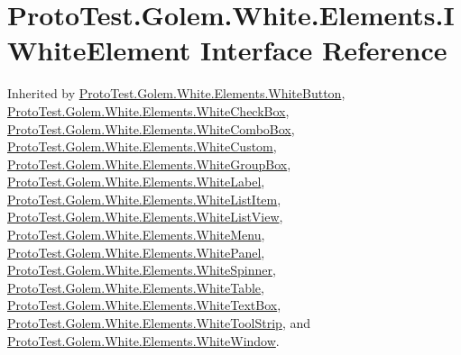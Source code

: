 \hypertarget{interface_proto_test_1_1_golem_1_1_white_1_1_elements_1_1_i_white_element}{\section{Proto\-Test.\-Golem.\-White.\-Elements.\-I\-White\-Element Interface Reference}
\label{interface_proto_test_1_1_golem_1_1_white_1_1_elements_1_1_i_white_element}
}


Inherited by \hyperlink{class_proto_test_1_1_golem_1_1_white_1_1_elements_1_1_white_button}{Proto\-Test.\-Golem.\-White.\-Elements.\-White\-Button}, \hyperlink{class_proto_test_1_1_golem_1_1_white_1_1_elements_1_1_white_check_box}{Proto\-Test.\-Golem.\-White.\-Elements.\-White\-Check\-Box}, \hyperlink{class_proto_test_1_1_golem_1_1_white_1_1_elements_1_1_white_combo_box}{Proto\-Test.\-Golem.\-White.\-Elements.\-White\-Combo\-Box}, \hyperlink{class_proto_test_1_1_golem_1_1_white_1_1_elements_1_1_white_custom}{Proto\-Test.\-Golem.\-White.\-Elements.\-White\-Custom}, \hyperlink{class_proto_test_1_1_golem_1_1_white_1_1_elements_1_1_white_group_box}{Proto\-Test.\-Golem.\-White.\-Elements.\-White\-Group\-Box}, \hyperlink{class_proto_test_1_1_golem_1_1_white_1_1_elements_1_1_white_label}{Proto\-Test.\-Golem.\-White.\-Elements.\-White\-Label}, \hyperlink{class_proto_test_1_1_golem_1_1_white_1_1_elements_1_1_white_list_item}{Proto\-Test.\-Golem.\-White.\-Elements.\-White\-List\-Item}, \hyperlink{class_proto_test_1_1_golem_1_1_white_1_1_elements_1_1_white_list_view}{Proto\-Test.\-Golem.\-White.\-Elements.\-White\-List\-View}, \hyperlink{class_proto_test_1_1_golem_1_1_white_1_1_elements_1_1_white_menu}{Proto\-Test.\-Golem.\-White.\-Elements.\-White\-Menu}, \hyperlink{class_proto_test_1_1_golem_1_1_white_1_1_elements_1_1_white_panel}{Proto\-Test.\-Golem.\-White.\-Elements.\-White\-Panel}, \hyperlink{class_proto_test_1_1_golem_1_1_white_1_1_elements_1_1_white_spinner}{Proto\-Test.\-Golem.\-White.\-Elements.\-White\-Spinner}, \hyperlink{class_proto_test_1_1_golem_1_1_white_1_1_elements_1_1_white_table}{Proto\-Test.\-Golem.\-White.\-Elements.\-White\-Table}, \hyperlink{class_proto_test_1_1_golem_1_1_white_1_1_elements_1_1_white_text_box}{Proto\-Test.\-Golem.\-White.\-Elements.\-White\-Text\-Box}, \hyperlink{class_proto_test_1_1_golem_1_1_white_1_1_elements_1_1_white_tool_strip}{Proto\-Test.\-Golem.\-White.\-Elements.\-White\-Tool\-Strip}, and \hyperlink{class_proto_test_1_1_golem_1_1_white_1_1_elements_1_1_white_window}{Proto\-Test.\-Golem.\-White.\-Elements.\-White\-Window}.

